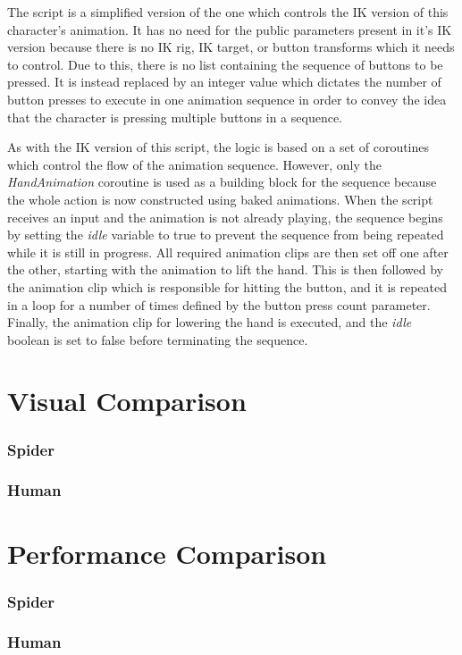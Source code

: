 The script is a simplified version of the one which controls the IK version of
this character's animation. It has no need for the public parameters present in
it's IK version because there is no IK rig, IK target, or button transforms
which it needs to control. Due to this, there is no list containing the sequence
of buttons to be pressed. It is instead replaced by an integer value which
dictates the number of button presses to execute in one animation sequence in
order to convey the idea that the character is pressing multiple buttons in
a sequence. 

As with the IK version of this script, the logic is based on a set of coroutines
which control the flow of the animation sequence. However, only the
\textit{HandAnimation} coroutine is used as a building block for the sequence
because the whole action is now constructed using baked animations. When the
script receives an input and the animation is not already playing, the sequence
begins by setting the \textit{idle} variable to true to prevent the sequence
from being repeated while it is still in progress. All required animation clips
are then set off one after the other, starting with the animation to lift the
hand. This is then followed by the animation clip which is responsible for
hitting the button, and it is repeated in a loop for a number of times defined
by the button press count parameter. Finally, the animation clip for lowering
the hand is executed, and the \textit{idle} boolean is set to false before
terminating the sequence.

\section{Visual Comparison}

\subsubsection{Spider}
\subsubsection{Human}

\section{Performance Comparison}

\subsubsection{Spider}
\subsubsection{Human}
